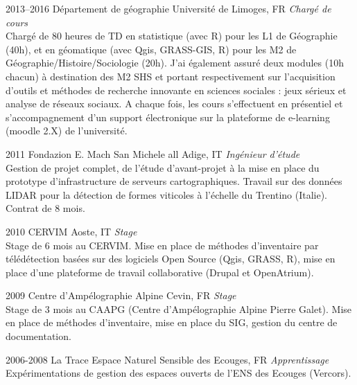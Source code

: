 \documentclass[]{cv-etienne}
\begin{document}
\begin{entrylist}
\entry
{2013--2016}
{Département de géographie}
{Université de Limoges, FR}
{\emph{Chargé de cours} \\
Chargé de 80 heures de TD en statistique (avec R) pour les L1 de Géographie (40h), et en géomatique (avec Qgis, GRASS-GIS, R) pour les M2 de Géographie/Histoire/Sociologie (20h). J'ai également assuré deux modules (10h chacun) à destination des M2 SHS et portant respectivement sur l’acquisition d’outils et méthodes de recherche innovante en sciences sociales : jeux sérieux et analyse de réseaux sociaux. A chaque fois, les cours s'effectuent en présentiel et s'accompagnement d'un support électronique sur la plateforme de e-learning (moodle 2.X) de l'université.
}
\end{entrylist}
\begin{entrylist}
\entry
{2011}
{Fondazion E. Mach}
{San Michele all Adige, IT}
{\emph{Ingénieur d'étude}\\
Gestion de projet complet, de l'étude d'avant-projet à la mise en place du prototype d'infrastructure de serveurs cartographiques. Travail sur des données LIDAR pour la détection de formes viticoles à l'échelle du Trentino (Italie). Contrat de 8 mois.
}
\end{entrylist}
\begin{entrylist}
\entry
{2010}
{CERVIM}
{Aoste, IT}
{\emph{Stage}\\
Stage de 6 mois au CERVIM. Mise en place de méthodes d'inventaire par télédétection basées sur des logiciels Open Source (Qgis, GRASS, R), mise en place d’une plateforme de travail collaborative (Drupal et OpenAtrium).
}
\end{entrylist}
\begin{entrylist}
\entry
{2009}
{Centre d'Ampélographie Alpine}
{Cevin, FR}
{\emph{Stage}\\
Stage de 3 mois au CAAPG (Centre d'Ampélographie Alpine Pierre Galet). Mise en place de méthodes d'inventaire, mise en place du SIG, gestion du centre de documentation.
}
\end{entrylist}
\begin{entrylist}
\entry
{2006-2008}
{La Trace}
{Espace Naturel Sensible des Ecouges, FR}
{\emph{Apprentissage}\\
Expérimentations de gestion des espaces ouverts de l'ENS des Ecouges (Vercors).
}
\end{entrylist}
\end{document}
